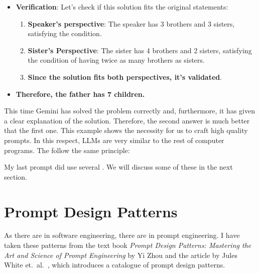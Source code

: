\begin{center}
{{{{\begin{minipage}{0.9\linewidth}
\begin{itemize}
            The family has 4 sons $(x)$ and 3 daughters $(y)$.

            
          \item \textbf{Verification}: 
            Let's check if this solution fits the original statements:
            \begin{enumerate}
            \item \textbf{Speaker's perspective}: The speaker has 3 brothers and 3 sisters, satisfying the condition.
            \item \textbf{Sister's Perspective}: The sister has 4 brothers and 2 sisters, satisfying the
                  condition of having twice as many brothers as sisters. 
            \item \textbf{Since the solution fits both perspectives, it's validated}.

           \end{enumerate}
         \item \textbf{Therefore, the father has 7 children.}
         \end{itemize}
\end{minipage}}}}}
\end{center}

This time Gemini has solved the problem correctly and, furthermore, it has given a clear explanation of the solution.
Therefore, the second answer is much better that the first one.  This example shows the necessity for us to craft high
quality prompts.  In this respect, LLMs are very similar to the rest of computer programs.  The follow the same
principle:
\begin{center}
  \colorbox{red}{}
\end{center}

My last prompt did use several .  We will discuss some of these in the next section.

\section{Prompt Design Patterns}
As there are  in software engineering, there are 
in prompt engineering.  I have taken these patterns from the text book
\textsl{Prompt Design Patterns: Mastering the Art and Science of Prompt Engineering} by Yi Zhou \cite{zhou:2023}
and the article by Jules White et.~al.~\cite{white:2023}, which introduces a catalogue of prompt design patterns.


